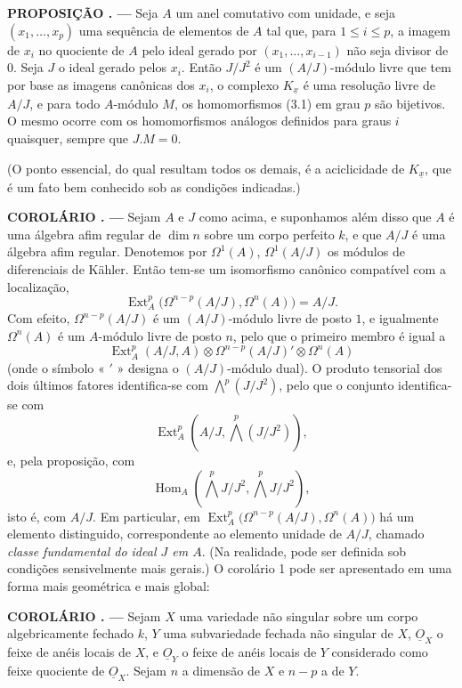 \documentclass[11pt,twoside,openany]{book}
\numberwithin{equation}{section}
\newcommand{\src}[1]{%
  \phantomsection\hypertarget{src:#1}{}%
  \marginpar{\raggedleft\footnotesize\sffamily #1}%
}
\newcommand{\Osh}{\underline{O}}
\theoremstyle{plain}
\theoremstyle{definition}
\theoremstyle{remark}
\newcommand{\result}[2]{%
  \par\medskip\noindent\textbf{#1%
  \if\relax\detokenize{#2}\relax\else\space#2\fi. ---}\enspace
}
\newcommand{\FgaUnitKey}{frontmatter}
\renewcommand{\src}[1]{%
  \phantomsection\hypertarget{src:\FgaUnitKey:#1}{}%
  \marginpar{\raggedleft\footnotesize\sffamily #1}%
}
\begin{document}
\src{175}
\result{PROPOSIÇÃO}{4} Seja $A$ um anel comutativo com unidade, e seja
$(x_1,\ldots,x_p)$ uma sequência de elementos de $A$ tal que, para $1\leq i\leq p$,
a imagem de $x_i$ no quociente de $A$ pelo ideal gerado por
$(x_1,\ldots,x_{i-1})$ não seja divisor de $0$. Seja $J$ o ideal gerado
pelos $x_i$. Então $J/J^{2}$ é um $(A/J)$-módulo livre que tem por base as
imagens canônicas dos $x_i$, o complexo $K_{\underline{x}}$ é uma resolução
livre de $A/J$, e para todo $A$-módulo $M$, os homomorfismos (3.1) em
grau $p$ são bijetivos. O mesmo ocorre com os homomorfismos análogos
definidos para graus $i$ quaisquer, sempre que $J.M=0$.

(O ponto essencial, do qual resultam todos os demais, é a aciclicidade de
$K_{\underline{x}}$, que é um fato bem conhecido sob as condições indicadas.)

\result{COROLÁRIO}{1} Sejam $A$ e $J$ como acima, e suponhamos além disso que
$A$ é uma álgebra afim regular de $\dim n$ sobre um corpo perfeito $k$, e
que $A/J$ é uma álgebra afim regular. Denotemos por $\Omega^{1}(A)$,
$\Omega^{1}(A/J)$ os módulos de diferenciais de Kähler. Então tem-se um
isomorfismo canônico compatível com a localização,
\begin{equation}\tag{3.5}
  \operatorname{Ext}_{A}^{p}\bigl(\Omega^{n-p}(A/J),\Omega^{n}(A)\bigr)=A/J.
\end{equation}
Com efeito, $\Omega^{n-p}(A/J)$ é um $(A/J)$-módulo livre de posto $1$, e igualmente
$\Omega^{n}(A)$ é um $A$-módulo livre de posto $n$,
pelo que o primeiro membro é igual a
\[
  \operatorname{Ext}_{A}^{p}(A/J,A)
  \otimes\Omega^{n-p}(A/J)'\otimes\Omega^{n}(A)
\]
(onde o símbolo « $'$ » designa o $(A/J)$-módulo dual). O produto tensorial dos
dois últimos fatores identifica-se com $\bigwedge^{p}(J/J^{2})$, pelo que o conjunto
identifica-se com
\[
  \operatorname{Ext}_{A}^{p}\!\left(A/J,\bigwedge^{p}(J/J^{2})\right),
\]
e, pela proposição, com
\[
  \operatorname{Hom}_{A}\!\left(\bigwedge^{p}J/J^{2},
  \bigwedge^{p}J/J^{2}\right),
\]
isto é, com $A/J$. Em particular, em
$\operatorname{Ext}_{A}^{p}\bigl(\Omega^{n-p}(A/J),\Omega^{n}(A)\bigr)$ há um
elemento distinguido, correspondente ao elemento unidade de $A/J$, chamado
\emph{classe fundamental do ideal $J$ em $A$}. (Na realidade, pode
ser definida sob condições sensivelmente mais gerais.) O
corolário 1 pode ser apresentado em uma forma mais geométrica e mais global:

\result{COROLÁRIO}{2} Sejam $X$ uma variedade não singular sobre um corpo
algebricamente fechado $k$, $Y$ uma subvariedade fechada não singular de $X$,
$\Osh_X$ o feixe de anéis locais de $X$, e $\Osh_Y$ o feixe de anéis
locais de $Y$ considerado como feixe quociente de $\Osh_X$. Sejam $n$ a
dimensão de $X$ e $n-p$ a de $Y$.
\end{document}
